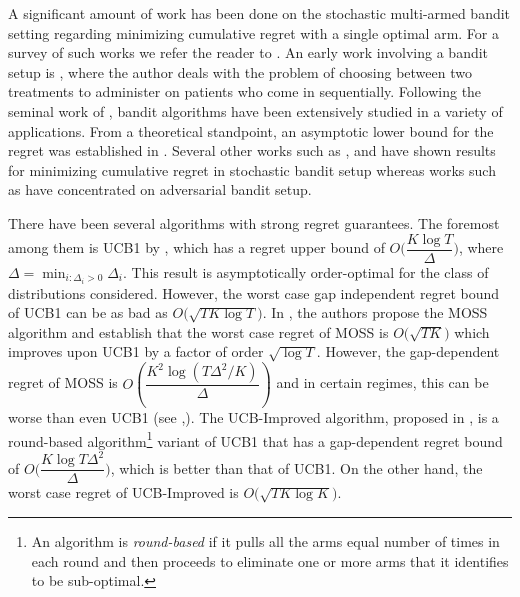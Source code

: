 	A significant amount of work has been done on the stochastic multi-armed bandit setting regarding minimizing cumulative regret with a single optimal arm. For a survey of such works we refer the reader to \cite{bubeck2012regret}. An early work involving a bandit setup is \cite{thompson1933likelihood}, where the author deals with the problem of choosing between two treatments to administer on patients who come in sequentially. Following the seminal work of  \cite{robbins1952some}, bandit algorithms have been extensively studied in a variety of applications. From a theoretical standpoint, an asymptotic lower bound for the regret was established in \cite{lai1985asymptotically}. Several other works such as \cite{auer2002finite},  \cite{audibert2009minimax} and \cite{auer2010ucb} have shown results for minimizing cumulative regret in stochastic bandit setup whereas works such as \cite{auer2002nonstochastic} have concentrated on adversarial bandit setup.
	
	

	There have been several algorithms with strong regret guarantees. The foremost among them is UCB1 by  \cite{auer2002finite}, which has a regret upper bound of $O\bigg(\dfrac{K\log T}{\Delta}\bigg)$, where $\Delta = \min_{i:\Delta_i>0} \Delta_i$. This result is asymptotically order-optimal for the class of distributions considered. However, the worst case gap independent regret bound of UCB1  can be as bad as $O \bigg(\sqrt{TK\log T}\bigg)$.  In \cite{audibert2009minimax}, the authors propose the MOSS algorithm and establish that the worst case regret of MOSS is $O\bigg(\sqrt{TK}\bigg)$ which improves upon UCB1 by a factor of order $\sqrt{\log T}$. However, the gap-dependent regret of MOSS is  $O\left(\dfrac{K^{2}\log\left(T\Delta^{2}/K\right)}{\Delta}\right)$ and in certain regimes, this can be worse than even UCB1 (see \cite{audibert2009minimax},\cite{lattimore2015optimally}). The UCB-Improved algorithm, proposed in \cite{auer2010ucb}, is a round-based algorithm\footnote{An algorithm is \textit{round-based} if it pulls all the arms equal number of times in each round and then proceeds to eliminate one or more arms that it identifies to be sub-optimal.} variant of UCB1 that has a gap-dependent regret bound of $O\bigg(\dfrac{K\log T\Delta^{2}}{\Delta}\bigg)$, which is better than that of UCB1. On the other hand, the worst case regret of UCB-Improved is $O\bigg(\sqrt{TK\log K}\bigg)$. 

